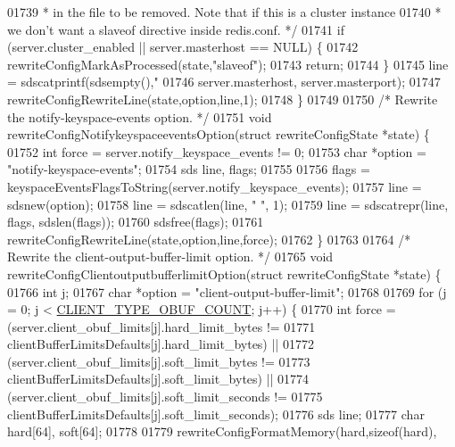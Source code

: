 \begin{DoxyCode}
{{{{{{{{{{{{{{{{{{{{{{{{{01739 \textcolor{comment}{     * in the file to be removed. Note that if this is a cluster instance}
01740 \textcolor{comment}{     * we don't want a slaveof directive inside redis.conf. */}
01741     \textcolor{keywordflow}{if} (server.cluster\_enabled || server.masterhost == NULL) \{
01742         rewriteConfigMarkAsProcessed(state,\textcolor{stringliteral}{"slaveof"});
01743         \textcolor{keywordflow}{return};
01744     \}
01745     line = sdscatprintf(sdsempty(),\textcolor{stringliteral}{"%
01746         server.masterhost, server.masterport);
01747     rewriteConfigRewriteLine(state,option,line,1);
01748 \}
01749 
01750 \textcolor{comment}{/* Rewrite the notify-keyspace-events option. */}
01751 \textcolor{keywordtype}{void} rewriteConfigNotifykeyspaceeventsOption(\textcolor{keyword}{struct} rewriteConfigState *state) \{
01752     \textcolor{keywordtype}{int} force = server.notify\_keyspace\_events != 0;
01753     \textcolor{keywordtype}{char} *option = \textcolor{stringliteral}{"notify-keyspace-events"};
01754     sds line, flags;
01755 
01756     flags = keyspaceEventsFlagsToString(server.notify\_keyspace\_events);
01757     line = sdsnew(option);
01758     line = sdscatlen(line, \textcolor{stringliteral}{" "}, 1);
01759     line = sdscatrepr(line, flags, sdslen(flags));
01760     sdsfree(flags);
01761     rewriteConfigRewriteLine(state,option,line,force);
01762 \}
01763 
01764 \textcolor{comment}{/* Rewrite the client-output-buffer-limit option. */}
01765 \textcolor{keywordtype}{void} rewriteConfigClientoutputbufferlimitOption(\textcolor{keyword}{struct} rewriteConfigState *state) \{
01766     \textcolor{keywordtype}{int} j;
01767     \textcolor{keywordtype}{char} *option = \textcolor{stringliteral}{"client-output-buffer-limit"};
01768 
01769     \textcolor{keywordflow}{for} (j = 0; j < \hyperlink{server_8h_aea8f6f3fac3a68e35807eba109dbc501}{CLIENT\_TYPE\_OBUF\_COUNT}; j++) \{
01770         \textcolor{keywordtype}{int} force = (server.client\_obuf\_limits[j].hard\_limit\_bytes !=
01771                     clientBufferLimitsDefaults[j].hard\_limit\_bytes) ||
01772                     (server.client\_obuf\_limits[j].soft\_limit\_bytes !=
01773                     clientBufferLimitsDefaults[j].soft\_limit\_bytes) ||
01774                     (server.client\_obuf\_limits[j].soft\_limit\_seconds !=
01775                     clientBufferLimitsDefaults[j].soft\_limit\_seconds);
01776         sds line;
01777         \textcolor{keywordtype}{char} hard[64], soft[64];
01778 
01779         rewriteConfigFormatMemory(hard,\textcolor{keyword}{sizeof}(hard),
}}}}}}}}}}}}}}}}}}}}}}}}}}
\end{DoxyCode}
